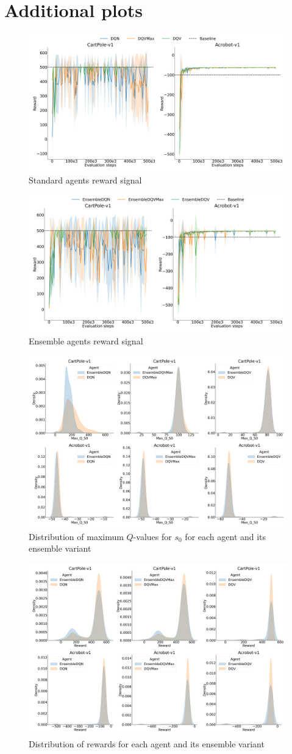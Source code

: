 \section{Additional plots}\label{sec:appendix_figs}
\begin{figure}[H]
  \centering
  \includegraphics[width=.5\textwidth]{img/dshift_plots_rwd.png}
  \caption{Standard agents reward signal}\label{fig:dshift_rwd}
\end{figure}

\begin{figure}[H]
  \centering
  \includegraphics[width=.5\textwidth]{img/dshift_plots_ensembles_rwd.png}
  \caption{Ensemble agents reward signal}\label{fig:dshift_ensemble_rwd}
\end{figure}

\begin{figure}[H]
  \centering
  \includegraphics[width=.5\textwidth]{img/all_qv_dist.png}
  \caption{Distribution of maximum $Q$-values for $s_0$ for each agent
    and its ensemble variant}\label{fig:qv_dist}
\end{figure}

\begin{figure}[H]
  \centering
  \includegraphics[width=.5\textwidth]{img/all_rwd_dist.png}
  \caption{Distribution of rewards for each agent and its ensemble
    variant}\label{fig:rwd_dist}
\end{figure}

